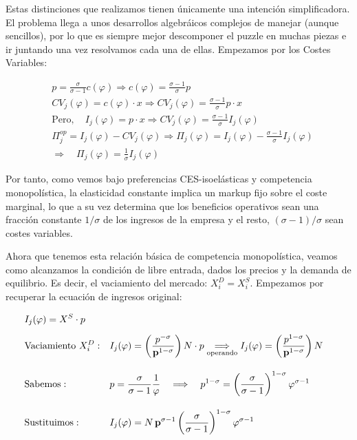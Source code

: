 \documentclass[10pt,a4paper]{article}
\begin{document}
Estas distinciones que realizamos tienen únicamente una intención simplificadora. El problema llega a unos desarrollos algebráicos complejos de manejar (aunque sencillos), por lo que es siempre mejor descomponer el puzzle en muchas piezas e ir juntando una vez resolvamos cada una de ellas. Empezamos por los Costes Variables:

$$\begin{aligned}
    &p=\frac{\sigma}{\sigma-1}c(\varphi)\Longrightarrow c(\varphi)=\frac{\sigma-1}{\sigma}p\\[0.5em]
    &CV_j(\varphi)=c(\varphi)\cdot x\Longrightarrow CV_j(\varphi)=\frac{\sigma-1}{\sigma}p\cdot x\\[0.5em]
    &\text{Pero},\quad I_j(\varphi)=p\cdot x\Longrightarrow CV_j(\varphi)=\frac{\sigma-1}{\sigma}I_j(\varphi)\\[0.5em]
    &\Pi_j^{op}=I_j(\varphi)-CV_j(\varphi)\Longrightarrow\Pi_j(\varphi)=I_j(\varphi)-\frac{\sigma-1}{\sigma}I_j(\varphi)\\[1em]
    &\Longrightarrow\quad \boxed{\Pi_j(\varphi)=\frac{1}{\sigma}I_j(\varphi)}
\end{aligned}$$

Por tanto, como vemos bajo preferencias CES-isoelásticas y competencia monopolística, la elasticidad constante implica un markup fijo sobre el coste marginal, lo que a su vez determina que los beneficios operativos sean una fracción constante $1/\sigma$ de los ingresos de la empresa y el resto, $(\sigma-1)/\sigma$ sean costes variables.

Ahora que tenemos esta relación básica de competencia monopolística, veamos como alcanzamos la condición de libre entrada, dados los precios y la demanda de equilibrio. Es decir, el vaciamiento del mercado: $X_i^D=X_i^S$. Empezamos por recuperar la ecuación de ingresos original:

$$\begin{aligned}
    &I_j(\varphi)=X^S\cdot p\\[0.5em]
    &\text{Vaciamiento $X_i^D$}:&&I_j(\varphi)=\left(\frac{p^{-\sigma}}{\mathbf p^{1-\sigma}}\right)N\cdot p\underset{\text{\scriptsize operando}}{\Longrightarrow} I_j(\varphi)=\left(\frac{p^{1-\sigma}}{\mathbf p^{1-\sigma}}\right)N\\[1em]
    &\text{Sabemos}:&&p=\frac{\sigma}{\sigma-1}\frac{1}{\varphi}\quad\Longrightarrow\quad p^{1-\sigma}=\left(\frac{\sigma}{\sigma-1}\right)^{1-\sigma}\varphi^{\sigma-1}\\[1em]
    &\text{Sustituimos}:&& I_j(\varphi)=N\,\mathbf p^{\sigma-1}\left(\frac{\sigma}{\sigma-1}\right)^{1-\sigma}\varphi^{\sigma-1}
\end{aligned}$$
\end{document}
